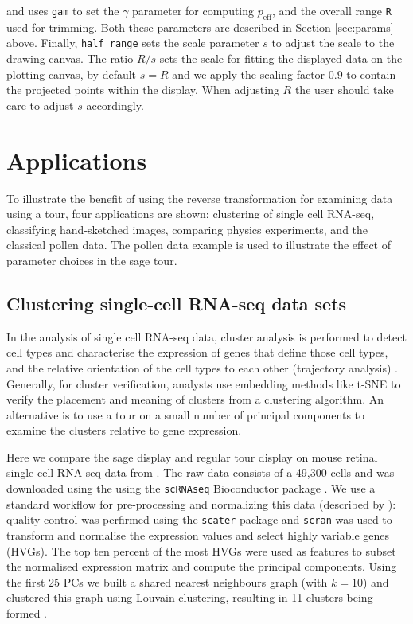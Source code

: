 \documentclass[]{interact}
\theoremstyle{plain}%
\theoremstyle{definition}
\theoremstyle{remark}
\begin{document}
\noindent and uses \texttt{gam} to set the \(\gamma\) parameter for
computing \(p_{\mathrm{eff}}\), and the overall range \texttt{R} used
for trimming. Both these parameters are described in Section
\ref{sec:params} above. Finally, \texttt{half\_range} sets the scale
parameter \(s\) to adjust the scale to the drawing canvas. The ratio
\(R/s\) sets the scale for fitting the displayed data on the plotting
canvas, by default \(s = R\) and we apply the scaling factor \(0.9\) to
contain the projected points within the display. When adjusting \(R\)
the user should take care to adjust \(s\) accordingly.

\hypertarget{sec:application}{%
\section{Applications}\label{sec:application}}

To illustrate the benefit of using the reverse transformation for
examining data using a tour, four applications are shown: clustering of
single cell RNA-seq, classifying hand-sketched images, comparing physics
experiments, and the classical pollen data. The pollen data example is
used to illustrate the effect of parameter choices in the sage tour.

\hypertarget{sec:appl1}{%
\subsection{Clustering single-cell RNA-seq data sets}\label{sec:appl1}}

In the analysis of single cell RNA-seq data, cluster analysis is
performed to detect cell types and characterise the expression of genes
that define those cell types, and the relative orientation of the cell
types to each other (trajectory analysis) \citep{Amezquita2020-at}.
Generally, for cluster verification, analysts use embedding methods like
t-SNE to verify the placement and meaning of clusters from a clustering
algorithm. An alternative is to use a tour on a small number of
principal components to examine the clusters relative to gene
expression.

Here we compare the sage display and regular tour display on mouse
retinal single cell RNA-seq data from \citet{Macosko2015-ot}. The raw
data consists of a 49,300 cells and was downloaded using the using the
\texttt{scRNAseq} Bioconductor package \citep{scRNAseq-d}. We use a
standard workflow for pre-processing and normalizing this data
(described by \citet{Amezquita2020-at}): quality control was perfirmed
using the \texttt{scater} package \citep{McCarthy2017} and
\texttt{scran} \citep{Lun2016} was used to transform and normalise the
expression values and select highly variable genes (HVGs). The top ten
percent of the most HVGs were used as features to subset the normalised
expression matrix and compute the principal components. Using the first
25 PCs we built a shared nearest neighbours graph (with \(k = 10\)) and
clustered this graph using Louvain clustering, resulting in 11 clusters
being formed \citep{Blondel2008-bx}.
\end{document}
